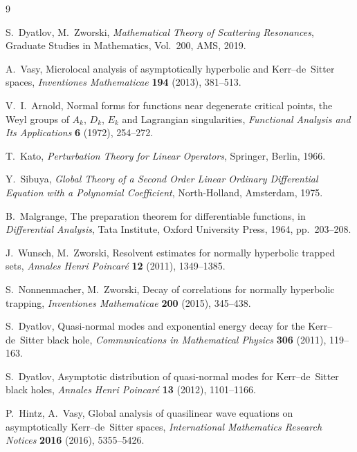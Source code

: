 \documentclass[12pt,a4paper]{amsart}
\theoremstyle{remark}
\begin{document}
\begin{thebibliography}{9}

S.~Dyatlov, M.~Zworski,
\textit{Mathematical Theory of Scattering Resonances},
Graduate Studies in Mathematics, Vol.~200, AMS, 2019.

A.~Vasy,
Microlocal analysis of asymptotically hyperbolic and Kerr--de~Sitter spaces,
\textit{Inventiones Mathematicae} \textbf{194} (2013), 381--513.

V.~I.~Arnold,
Normal forms for functions near degenerate critical points, the Weyl groups of
$A_k$, $D_k$, $E_k$ and Lagrangian singularities,
\textit{Functional Analysis and Its Applications} \textbf{6} (1972), 254--272.

T.~Kato,
\textit{Perturbation Theory for Linear Operators},
Springer, Berlin, 1966.

Y.~Sibuya,
\textit{Global Theory of a Second Order Linear Ordinary Differential Equation
with a Polynomial Coefficient},
North-Holland, Amsterdam, 1975.

B.~Malgrange,
The preparation theorem for differentiable functions,
in \textit{Differential Analysis}, Tata Institute,
Oxford University Press, 1964, pp.~203--208.

J.~Wunsch, M.~Zworski,
Resolvent estimates for normally hyperbolic trapped sets,
\textit{Annales Henri Poincar\'e} \textbf{12} (2011), 1349--1385.

S.~Nonnenmacher, M.~Zworski,
Decay of correlations for normally hyperbolic trapping,
\textit{Inventiones Mathematicae} \textbf{200} (2015), 345--438.

S.~Dyatlov,
Quasi-normal modes and exponential energy decay for the
Kerr--de~Sitter black hole,
\textit{Communications in Mathematical Physics} \textbf{306} (2011), 119--163.

S.~Dyatlov,
Asymptotic distribution of quasi-normal modes for Kerr--de~Sitter black holes,
\textit{Annales Henri Poincar\'e} \textbf{13} (2012), 1101--1166.

P.~Hintz, A.~Vasy,
Global analysis of quasilinear wave equations on asymptotically Kerr--de~Sitter spaces,
\textit{International Mathematics Research Notices} \textbf{2016} (2016), 5355--5426.


\end{thebibliography}
\end{document}
